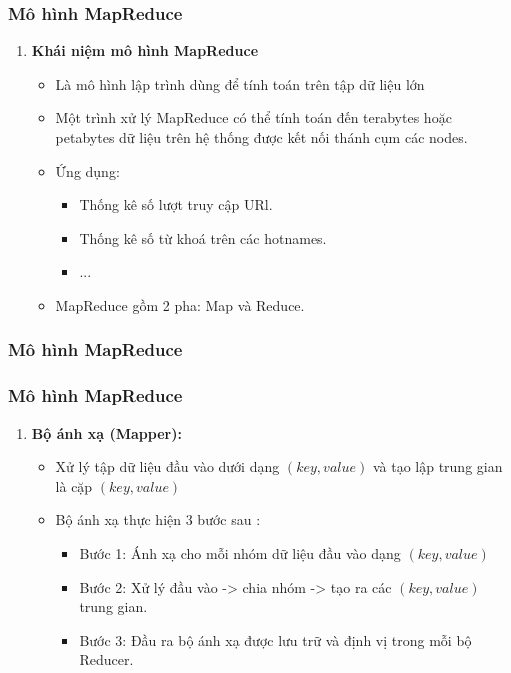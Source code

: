 \documentclass[12pt]{beamer}
\begin{document}
	\begin{frame}
		\frametitle{Mô hình MapReduce}
		\begin{enumerate} [\textbf{1.}]
			\item \textbf{Khái niệm mô hình MapReduce}
				\begin{itemize}
					\item Là mô hình lập trình dùng để tính toán trên tập dữ liệu lớn
					\item Một trình xử lý MapReduce có thể tính toán đến terabytes hoặc petabytes dữ liệu trên hệ thống được kết nối thánh cụm các nodes.
					\item Ứng dụng:
						\begin{itemize}
							\item Thống kê số lượt truy cập URl.
							\item Thống kê số từ khoá trên các hotnames.
							\item ...
						\end{itemize}
					\item MapReduce gồm 2 pha: Map và Reduce.
				\end{itemize}
		\end{enumerate}
	\end{frame}

	\begin{frame}
		\frametitle{Mô hình MapReduce}
	\end{frame}

	\begin{frame}
		\frametitle{Mô hình MapReduce}
		\begin{enumerate} [\textbf{2.}]
			\item \textbf{Bộ ánh xạ (Mapper):}
				\begin{itemize}
					\item Xử lý tập dữ liệu đầu vào dưới dạng $(key, value)$ và tạo lập trung gian là cặp $(key, value)$
					\item Bộ ánh xạ thực hiện 3 bước sau :
						\begin{itemize}
							\item Bước 1: Ánh xạ cho mỗi nhóm dữ liệu đầu vào dạng $(key, value)$
							\item Bước 2: Xử lý đầu vào -> chia nhóm -> tạo ra các $(key, value)$ trung gian.
							\item Bước 3: Đầu ra bộ ánh xạ được lưu trữ và định vị trong mỗi bộ Reducer.
						\end{itemize}
				\end{itemize}
		\end{enumerate}
	\end{frame}
\end{document}
